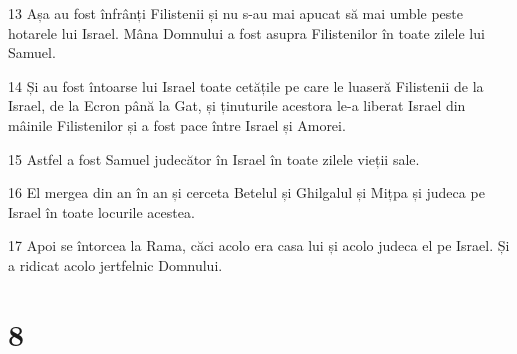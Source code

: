 \par 13 Așa au fost înfrânți Filistenii și nu s-au mai apucat să mai umble peste hotarele lui Israel. Mâna Domnului a fost asupra Filistenilor în toate zilele lui Samuel.
\par 14 Și au fost întoarse lui Israel toate cetățile pe care le luaseră Filistenii de la Israel, de la Ecron până la Gat, și ținuturile acestora le-a liberat Israel din mâinile Filistenilor și a fost pace între Israel și Amorei.
\par 15 Astfel a fost Samuel judecător în Israel în toate zilele vieții sale.
\par 16 El mergea din an în an și cerceta Betelul și Ghilgalul și Mițpa și judeca pe Israel în toate locurile acestea.
\par 17 Apoi se întorcea la Rama, căci acolo era casa lui și acolo judeca el pe Israel. Și a ridicat acolo jertfelnic Domnului.

\chapter{8}

